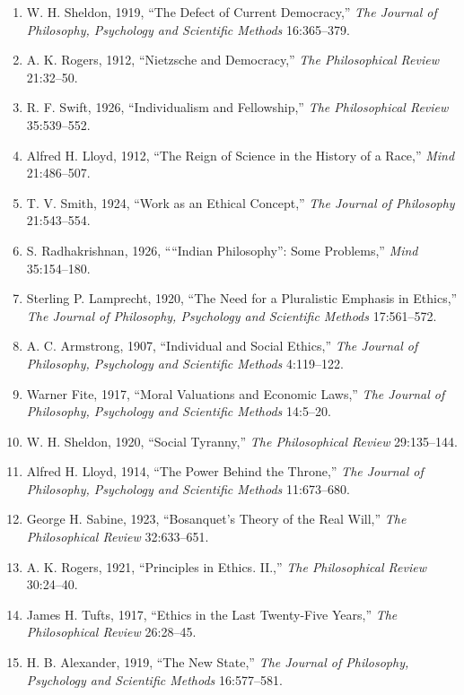 \documentclass[
]{article}
\begin{document}
\begin{enumerate}
\def\labelenumi{\arabic{enumi}.}
\item
  W. H. Sheldon, 1919, ``The Defect of Current Democracy,'' \emph{The
  Journal of Philosophy, Psychology and Scientific Methods} 16:365--379.
\item
  A. K. Rogers, 1912, ``Nietzsche and Democracy,'' \emph{The
  Philosophical Review} 21:32--50.
\item
  R. F. Swift, 1926, ``Individualism and Fellowship,'' \emph{The
  Philosophical Review} 35:539--552.
\item
  Alfred H. Lloyd, 1912, ``The Reign of Science in the History of a
  Race,'' \emph{Mind} 21:486--507.
\item
  T. V. Smith, 1924, ``Work as an Ethical Concept,'' \emph{The Journal
  of Philosophy} 21:543--554.
\item
  S. Radhakrishnan, 1926, ````Indian Philosophy'': Some Problems,''
  \emph{Mind} 35:154--180.
\item
  Sterling P. Lamprecht, 1920, ``The Need for a Pluralistic Emphasis in
  Ethics,'' \emph{The Journal of Philosophy, Psychology and Scientific
  Methods} 17:561--572.
\item
  A. C. Armstrong, 1907, ``Individual and Social Ethics,'' \emph{The
  Journal of Philosophy, Psychology and Scientific Methods} 4:119--122.
\item
  Warner Fite, 1917, ``Moral Valuations and Economic Laws,'' \emph{The
  Journal of Philosophy, Psychology and Scientific Methods} 14:5--20.
\item
  W. H. Sheldon, 1920, ``Social Tyranny,'' \emph{The Philosophical
  Review} 29:135--144.
\item
  Alfred H. Lloyd, 1914, ``The Power Behind the Throne,'' \emph{The
  Journal of Philosophy, Psychology and Scientific Methods} 11:673--680.
\item
  George H. Sabine, 1923, ``Bosanquet's Theory of the Real Will,''
  \emph{The Philosophical Review} 32:633--651.
\item
  A. K. Rogers, 1921, ``Principles in Ethics. II.,'' \emph{The
  Philosophical Review} 30:24--40.
\item
  James H. Tufts, 1917, ``Ethics in the Last Twenty-Five Years,''
  \emph{The Philosophical Review} 26:28--45.
\item
  H. B. Alexander, 1919, ``The New State,'' \emph{The Journal of
  Philosophy, Psychology and Scientific Methods} 16:577--581.
\end{enumerate}
\end{document}
